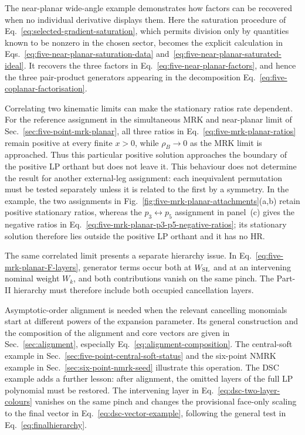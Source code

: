 \documentclass[a4paper,11pt]{article}
\begin{document}
The near-planar wide-angle example demonstrates how factors can be recovered
when no individual derivative displays them.  Here the saturation procedure
of Eq.~\eqref{eq:selected-gradient-saturation}, which permits division only by
quantities known to be nonzero in the chosen sector, becomes the explicit
calculation in Eqs.~\eqref{eq:five-near-planar-saturation-data}
and~\eqref{eq:five-near-planar-saturated-ideal}.  It recovers the three factors
in Eq.~\eqref{eq:five-near-planar-factors}, and hence the three pair-product
generators appearing in the decomposition
Eq.~\eqref{eq:five-coplanar-factorisation}.

Correlating two kinematic limits can make the stationary ratios rate
dependent.  For the reference assignment in the simultaneous MRK and
near-planar limit of Sec.~\ref{sec:five-point-mrk-planar}, all three ratios in
Eq.~\eqref{eq:five-mrk-planar-ratios} remain positive at every finite
\(x>0\), while \(\rho_B\to0\) as the MRK limit is approached.  Thus this
particular positive solution approaches the boundary of the positive LP
orthant but does not leave it.  This behaviour does not determine the result
for another external-leg assignment: each inequivalent permutation must be
tested separately unless it is related to the first by a symmetry.  In the
example, the two assignments in
Fig.~\ref{fig:five-mrk-planar-attachments}(a,b) retain positive stationary
ratios, whereas the \(p_3\leftrightarrow p_5\) assignment in panel~(c) gives
the negative ratios in
Eq.~\eqref{eq:five-mrk-planar-p3-p5-negative-ratios}; its stationary solution
therefore lies outside the positive LP orthant and it has no HR.

The same correlated limit presents a separate hierarchy issue.  In
Eq.~\eqref{eq:five-mrk-planar-F-layers}, generator terms occur both at
\(W_{\rm SL}\) and at an intervening nominal weight \(W_k\), and both
contributions vanish on the same pinch.  The Part-II hierarchy must therefore
include both occupied cancellation layers.

Asymptotic-order alignment is needed when the relevant cancelling monomials
start at different powers of the expansion parameter.  Its general
construction and the composition of the alignment and core vectors are given
in Sec.~\ref{sec:alignment}, especially
Eq.~\eqref{eq:alignment-composition}.  The central-soft example in
Sec.~\ref{sec:five-point-central-soft-status} and the six-point NMRK example in
Sec.~\ref{sec:six-point-nmrk-seed} illustrate this operation.  The DSC example
adds a further lesson: after alignment, the omitted layers of the full LP
polynomial must be restored.  The intervening layer in
Eq.~\eqref{eq:dsc-two-layer-colours} vanishes on the same pinch and changes the
provisional face-only scaling to the final vector in
Eq.~\eqref{eq:dsc-vector-example}, following the general test in
Eq.~\eqref{eq:finalhierarchy}.
\end{document}
